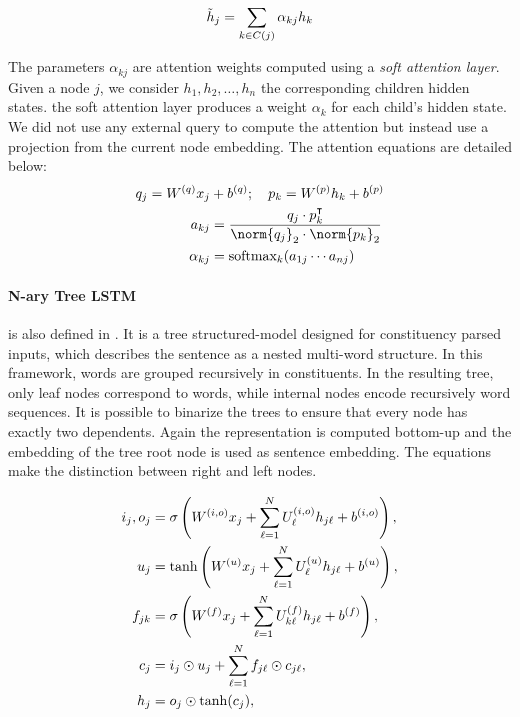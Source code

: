 \begin{equation}
    \tilde{h}_j = \sum_{k \in C(j)} \alpha_{kj} h_k \labeq{treelstm-att} 
\end{equation}

The parameters $\alpha_{kj}$ are attention weights computed using a \emph{soft attention layer}. Given a node $j$, we consider $h_1, h_2, \dots, h_{n}$ the corresponding children hidden states. the soft attention layer produces a weight $\alpha_k$ for each child's hidden state. We did not use any external query to compute the attention but instead use a projection from the current node embedding. The attention equations are detailed below:
\begin{align}
    q_j = W^{(q)}x_j& +b^{(q)} ;\quad p_k = W^{(p)}h_k +b^{(p)} \\
    a_{kj} &= \frac{q_j \cdot p_k^{\intercal}}{\norm{q_j}_2\cdot\norm{p_k}_2} \label{eq:attention-w} \\
    \alpha_{kj} &= \text{softmax}_k(a_{1j} \cdots a_{nj})
\end{align}

\paragraph{N-ary Tree LSTM} is also defined in \textcite{tai_15}. It is a tree structured-model designed for constituency parsed inputs, which describes the sentence as a nested multi-word structure. In this framework, words are grouped recursively in constituents. In the resulting tree, only leaf nodes correspond to words, while internal nodes encode recursively word sequences. It is possible to binarize the trees to ensure that every node has exactly two dependents. Again the representation is computed bottom-up and the embedding of the tree root node is used as sentence embedding. The equations make the distinction between right and left nodes.

\begin{align}
i_j, o_j &=\sigma \left( W^{(i, o)} x_j + \sum_{\ell=1}^N U^{(i, o)}_\ell h_{j\ell} + b^{(i, o)} \right), \labeq{nary-treelstm-def-first}\\
u_j &= \tanh\left( W^{(u)} x_j + \sum_{\ell=1}^N U^{(u)}_\ell h_{j\ell}  + b^{(u)} \right), \\
f_{jk} &= \sigma\left( W^{(f)} x_j + \sum_{\ell=1}^N U^{(f)}_{k\ell} h_{j\ell} + b^{(f)} \right), \labeq{nary-treelstm-def-f}\\
c_j &= i_j \odot u_j + \sum_{\ell=1}^N f_{j\ell} \odot c_{j\ell}, \\
h_j &= o_j \odot \tanh(c_j), \labeq{nary-treelstm-def-last}
\end{align}

